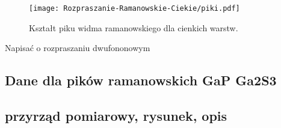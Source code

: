 \begin{figure}[H]
	\begin{center}
		\texttt{[image: Rozpraszanie-Ramanowskie-Ciekie/piki.pdf]}
		\caption{Kształt piku widma ramanowskiego dla cienkich warstw.}
	\end{center}
\end{figure}

Napisać o rozpraszaniu dwufononowym

\subsection{Dane dla pików ramanowskich GaP Ga2S3}

\subsection{przyrząd pomiarowy, rysunek, opis}
